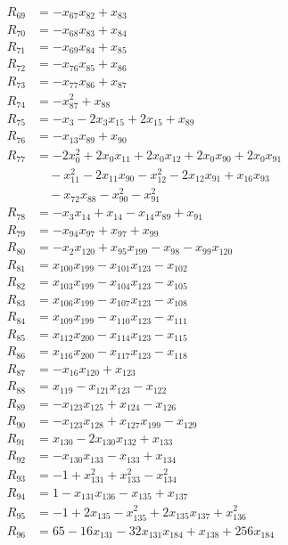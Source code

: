 \begin{align*}
R_{69} &= -x_{67}x_{82} +x_{83}\\
R_{70} &= -x_{68}x_{83} +x_{84}\\
R_{71} &= -x_{69}x_{84} +x_{85}\\
R_{72} &= -x_{76}x_{85} +x_{86}\\
R_{73} &= -x_{77}x_{86} +x_{87}\\
R_{74} &= -x_{87}^{2} +x_{88}\\
R_{75} &= -x_{3} -2x_{3}x_{15} +2x_{15} +x_{89}\\
R_{76} &= -x_{13}x_{89} +x_{90}\\
R_{77} &= -2x_{0}^{2} +2x_{0}x_{11} +2x_{0}x_{12} +2x_{0}x_{90} +2x_{0}x_{91}\\
&\quad -x_{11}^{2} -2x_{11}x_{90} -x_{12}^{2} -2x_{12}x_{91} +x_{16}x_{93}\\
&\quad -x_{72}x_{88} -x_{90}^{2} -x_{91}^{2}\\
R_{78} &= -x_{3}x_{14} +x_{14} -x_{14}x_{89} +x_{91}\\
R_{79} &= -x_{94}x_{97} +x_{97} +x_{99}\\
R_{80} &= -x_{2}x_{120} +x_{95}x_{199} -x_{98} -x_{99}x_{120}\\
R_{81} &= x_{100}x_{199} -x_{101}x_{123} -x_{102}\\
R_{82} &= x_{103}x_{199} -x_{104}x_{123} -x_{105}\\
R_{83} &= x_{106}x_{199} -x_{107}x_{123} -x_{108}\\
R_{84} &= x_{109}x_{199} -x_{110}x_{123} -x_{111}\\
R_{85} &= x_{112}x_{200} -x_{114}x_{123} -x_{115}\\
R_{86} &= x_{116}x_{200} -x_{117}x_{123} -x_{118}\\
R_{87} &= -x_{16}x_{120} +x_{123}\\
R_{88} &= x_{119} -x_{121}x_{123} -x_{122}\\
R_{89} &= -x_{123}x_{125} +x_{124} -x_{126}\\
R_{90} &= -x_{123}x_{128} +x_{127}x_{199} -x_{129}\\
R_{91} &= x_{130} -2x_{130}x_{132} +x_{133}\\
R_{92} &= -x_{130}x_{133} -x_{133} +x_{134}\\
R_{93} &= -1 +x_{131}^{2} +x_{133}^{2} -x_{134}^{2}\\
R_{94} &= 1 -x_{131}x_{136} -x_{135} +x_{137}\\
R_{95} &= -1 +2x_{135} -x_{135}^{2} +2x_{135}x_{137} +x_{136}^{2}\\
R_{96} &= 65 -16x_{131} -32x_{131}x_{184} +x_{138} +256x_{184}\\

\end{align*}

